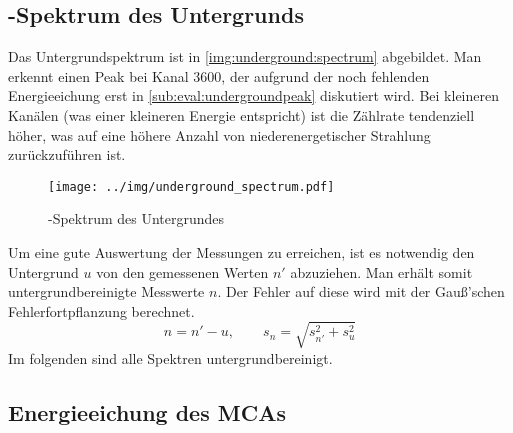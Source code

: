 \subsection{\textgamma-Spektrum des Untergrunds}
Das Untergrundspektrum ist in \autoref{img:underground:spectrum} abgebildet. Man erkennt einen Peak bei Kanal 3600, der aufgrund der noch 
fehlenden Energieeichung erst in \ref{sub:eval:undergroundpeak} diskutiert wird. Bei kleineren Kanälen (was einer kleineren Energie entspricht) ist 
die Zählrate tendenziell höher, was auf eine höhere Anzahl von niederenergetischer Strahlung zurückzuführen ist. 
\begin{figure}[H]
\begin{center}
  \texttt{[image: ../img/underground\_spectrum.pdf]}
  \caption{\textgamma-Spektrum des Untergrundes}
  \label{img:underground:spectrum}
\end{center}
\end{figure}
Um eine gute Auswertung der Messungen zu erreichen, ist es notwendig den Untergrund $u$ von den gemessenen Werten $n'$ abzuziehen. Man erhält 
somit untergrundbereinigte Messwerte $n$. Der Fehler auf diese wird mit der Gauß'schen Fehlerfortpflanzung berechnet.
\begin{equation}
  n = n' - u, \qquad s_n = \sqrt{s_{n'}^2 + s_u^2}
\end{equation}
Im folgenden sind alle Spektren untergrundbereinigt.

\subsection{Energieeichung des MCAs}
